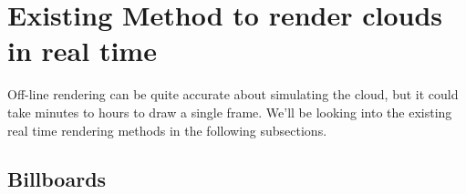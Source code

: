\section{Existing Method to render clouds in real time}
Off-line rendering can be quite accurate about simulating the cloud, but it could take minutes to hours to draw a single frame. We'll be looking into the existing real time rendering methods in the following subsections.

\subsection{Billboards}
